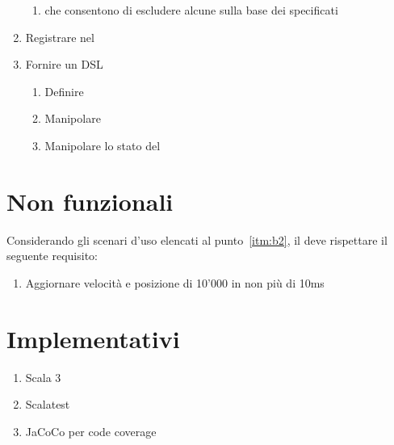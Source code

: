 \begin{enumerate}[label=\textbf{\ref{sec:funzionali}.\arabic*}]
\begin{enumerate}[label=\textbf{\ref{itm:f7}.\arabic*}]
        \item \label{itm:ff11} \System che consentono di escludere alcune \Entity sulla base dei \Component specificati
    \end{enumerate}
    \item \label{itm:f8} Registrare \System nel \World
    \item \label{itm:f9} Fornire un DSL
    \begin{enumerate}[label=\textbf{\ref{itm:f9}.\arabic*}]
        \item \label{itm:ff12} Definire \System
        \item \label{itm:ff13} Manipolare \Entity
        \item \label{itm:ff14} Manipolare lo stato del \World
    \end{enumerate}
\end{enumerate}


\section{Non funzionali}\label{sec:non-funzionali}
Considerando gli scenari d'uso elencati al punto~\ref{itm:b2}, il \System deve rispettare il seguente requisito:
\begin{enumerate}[label=\textbf{\ref{sec:non-funzionali}.\arabic*}]
    \item \label{itm:nf1} Aggiornare velocità e posizione di 10'000 \Entity in non più di 10ms
\end{enumerate}


\section{Implementativi}\label{sec:implementativi}
\begin{enumerate}[label=\textbf{\ref{sec:implementativi}.\arabic*}]
    \item \label{itm:i1} Scala 3
    \item \label{itm:i2} Scalatest
    \item \label{itm:i3} JaCoCo per code coverage
\end{enumerate}